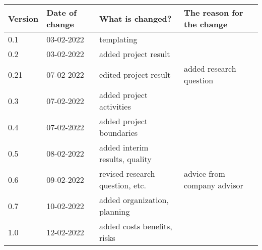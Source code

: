 \begin{tabular}{ | l | l | l | l |}
    \hline
    \textbf{Version} & \textbf{Date of change} & \textbf{What is changed?} & \textbf{The reason for the change} \\ \hline
    0.1 & 03-02-2022 & templating & \\
    0.2 & 03-02-2022 & added project result & \\
    0.21 & 07-02-2022 & edited project result & added research question\\
    0.3 & 07-02-2022 & added project activities &\\
    0.4 & 07-02-2022 & added project boundaries &\\
    0.5 & 08-02-2022 & added interim results, quality &\\
    0.6 & 09-02-2022 & revised research question, etc. & advice from company advisor\\
    0.7 & 10-02-2022 & added organization, planning &\\
    1.0 & 12-02-2022 & added costs benefits, risks&\\
    \hline
\end{tabular}